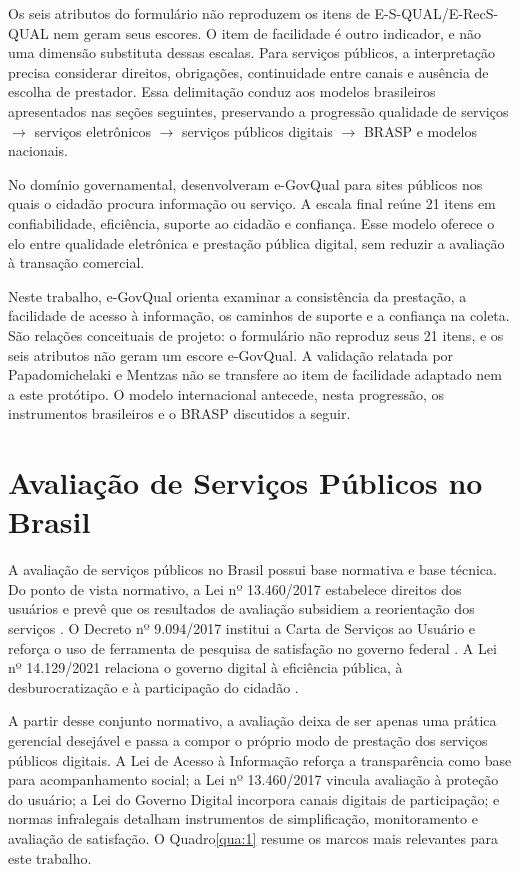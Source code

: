 Os seis atributos do formulário não reproduzem os itens de E-S-QUAL/E-RecS-QUAL nem geram seus escores. O item de facilidade é outro indicador, e não uma dimensão substituta dessas escalas. Para serviços públicos, a interpretação precisa considerar direitos, obrigações, continuidade entre canais e ausência de escolha de prestador. Essa delimitação conduz aos modelos brasileiros apresentados nas seções seguintes, preservando a progressão qualidade de serviços \ensuremath{\rightarrow} serviços eletrônicos \ensuremath{\rightarrow} serviços públicos digitais \ensuremath{\rightarrow} BRASP e modelos nacionais.

No domínio governamental,  desenvolveram e-GovQual para sites públicos nos quais o cidadão procura informação ou serviço. A escala final reúne 21 itens em confiabilidade, eficiência, suporte ao cidadão e confiança. Esse modelo oferece o elo entre qualidade eletrônica e prestação pública digital, sem reduzir a avaliação à transação comercial.

Neste trabalho, e-GovQual orienta examinar a consistência da prestação, a facilidade de acesso à informação, os caminhos de suporte e a confiança na coleta. São relações conceituais de projeto: o formulário não reproduz seus 21 itens, e os seis atributos não geram um escore e-GovQual. A validação relatada por Papadomichelaki e Mentzas não se transfere ao item de facilidade adaptado nem a este protótipo. O modelo internacional antecede, nesta progressão, os instrumentos brasileiros e o BRASP discutidos a seguir.

\section{Avaliação de Serviços Públicos no Brasil}
\label{sec:2.5}

A avaliação de serviços públicos no Brasil possui base normativa e base técnica. Do ponto de vista normativo, a Lei nº 13.460/2017 estabelece direitos dos usuários e prevê que os resultados de avaliação subsidiem a reorientação dos serviços \cite{brasil2017lei}. O Decreto nº 9.094/2017 institui a Carta de Serviços ao Usuário e reforça o uso de ferramenta de pesquisa de satisfação no governo federal \cite{brasil2017decreto}. A Lei nº 14.129/2021 relaciona o governo digital à eficiência pública, à desburocratização e à participação do cidadão \cite{brasil2021}.

A partir desse conjunto normativo, a avaliação deixa de ser apenas uma prática gerencial desejável e passa a compor o próprio modo de prestação dos serviços públicos digitais. A Lei de Acesso à Informação reforça a transparência como base para acompanhamento social; a Lei nº 13.460/2017 vincula avaliação à proteção do usuário; a Lei do Governo Digital incorpora canais digitais de participação; e normas infralegais detalham instrumentos de simplificação, monitoramento e avaliação de satisfação. O Quadro\nobreakspace{}\ref{qua:1} resume os marcos mais relevantes para este trabalho.

